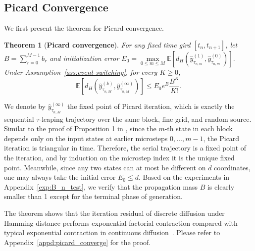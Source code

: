 \documentclass{article}
\newtheorem{theorem}{Theorem}[section]
\begin{document}
\subsection{Picard Convergence}
\label{sec:picard-theory}
We first present the theorem for Picard convergence.
\begin{theorem}[\bf Picard convergence]
\label{thm:picard-endpoint_main}
For any fixed time gird $[t_n,t_{n+1}]$, let $B=\sum_{r=0}^{M-1}b_r$ and initialization error $E_0=\max\limits_{0\le m\le M}\mathbb E\left[d_H\left(\widehat{y}^{(1)}_{\tau_{n,m}},\widehat{y}^{(0)}_{\tau_{n,m}}\right)\right].$
Under Assumption~\ref{ass:event-switching}, 
for every $K\ge0$,
\[
\mathbb E\left[d_H\left(\widehat{y}^{(k)}_{\tau_{n,M}},\widehat{y}^{(\infty)}_{\tau_{n,M}}\right)\right]
\le
E_0 e^B\frac{B^K}{K!}.
\]
\end{theorem}

We denote by \( \widehat{y}^{(\infty)}_{\tau_{n,M}}\) the fixed point of Picard iteration, which is exactly the sequential \(\tau\)-leaping trajectory over the same block, fine grid, and random source. Similar to the proof of Proposition 1 in \citep{shih2023parallel}, since the \(m\)-th state in each block depends only on the input states at earlier microsteps \(0,\ldots,m-1\), the Picard iteration is triangular in time. Therefore, the serial trajectory is a fixed point of the iteration, and by induction on the microstep index it is the unique fixed point. Meanwhile, since any two states can at most be different on $d$ coordinates, one may always take the initial error $E_0\le d$. Based on the experiments in Appendix~\ref{exp:B_n_test}, we verify that the propagation mass $B$ is clearly smaller than 1 except for the terminal phase of generation. 

The theorem shows that the iteration residual of discrete diffusion under Hamming distance performs exponential-factorial contraction compared with typical exponential contraction in continuous diffusion~\citep{chen2024accelerating}. 
Please refer to Appendix~\ref{appd:picard_converge} for the proof. 
\end{document}
